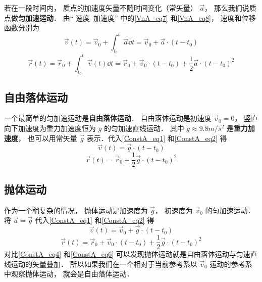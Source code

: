 

若在一段时间内， 质点的加速度矢量不随时间变化（常矢量） $\vec a$， 那么我们说质点做\textbf{匀加速运动}． 由“ 速度\ 加速度” 中的\autoref{VnA_eq7} 和\autoref{VnA_eq8}， 速度和位移函数分别为
\begin{equation}\label{ConstA_eq1}
\vec v(t) = \vec v_0 + \int_{t_0}^{t} \vec a \dd{t} = \vec v_0 + \vec a \cdot (t-t_0)
\end{equation}
\begin{equation}\label{ConstA_eq2}
\vec r(t) = \vec r_0 + \int_{t_0}^{t} \vec v(t) \dd{t} = \vec r_0 + \vec v_0\cdot (t-t_0) + \frac 12 \vec a\cdot (t-t_0)^2
\end{equation}




\subsection{自由落体运动}
一个最简单的匀加速运动是\textbf{自由落体运动}． 自由落体运动是初速度 $\vec v_0 = 0$， 竖直向下加速度为重力加速度恒为 $g$ 的匀加速直线运动． 其中 $g\approx 9.8m/s^2$ 是\textbf{重力加速度}， 也可以用常矢量 $\vec g$ 表示．代入\autoref{ConstA_eq1} 和\autoref{ConstA_eq2} 得
\begin{equation}\label{ConstA_eq3}
\vec v(t) = \vec g \cdot (t-t_0)
\end{equation}
\begin{equation}\label{ConstA_eq4}
\vec r(t) = \vec r_0 + \frac 12 \vec g \cdot (t-t_0)^2
\end{equation}

\subsection{抛体运动}
作为一个稍复杂的情况， 抛体运动是加速度为 $\vec g$， 初速度为 $\vec v_0$ 的匀加速运动． 将 $\vec a = \vec g$ 代入\autoref{ConstA_eq1} 和\autoref{ConstA_eq2} 得
\begin{equation}\label{ConstA_eq5}
\vec v(t) = \vec v_0 + \vec g \cdot (t-t_0)
\end{equation}
\begin{equation}\label{ConstA_eq6}
\vec r(t) = \vec r_0 + \vec v_0\cdot (t-t_0) + \frac 12 \vec g\cdot (t-t_0)^2
\end{equation}
对比\autoref{ConstA_eq4} 和\autoref{ConstA_eq6} 可以发现抛体运动就是自由落体运动与匀速直线运动的矢量叠加． 所以如果我们在一个相对于当前参考系以 $\vec v_0$ 运动的参考系中观察抛体运动， 就会是自由落体运动．

